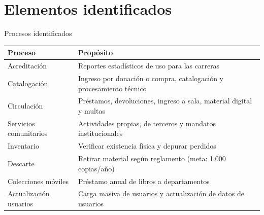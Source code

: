 \documentclass[aspectratio=169,10pt]{beamer}
\begin{document}
\section{Elementos identificados}
\begin{frame}{Procesos identificados}
  \small
  \begin{tabularx}{\textwidth}{@{}l X@{}}
    \toprule
    \textbf{Proceso} & \textbf{Propósito} \\
    \midrule
    Acreditación          & Reportes estadísticos de uso para las carreras \\
    Catalogación          & Ingreso por donación o compra, catalogación y procesamiento técnico \\
    Circulación           & Préstamos, devoluciones, ingreso a sala, material digital y multas \\
    Servicios comunitarios& Actividades propias, de terceros y mandatos institucionales \\
    Inventario            & Verificar existencia física y depurar perdidos \\
    Descarte              & Retirar material según reglamento (meta: 1.000 copias/año) \\
    Colecciones móviles   & Préstamo anual de libros a departamentos \\
    Actualización usuarios & Carga masiva de usuarios y actualización de datos de usuarios \\
    \bottomrule
  \end{tabularx}
\end{frame}
\end{document}
